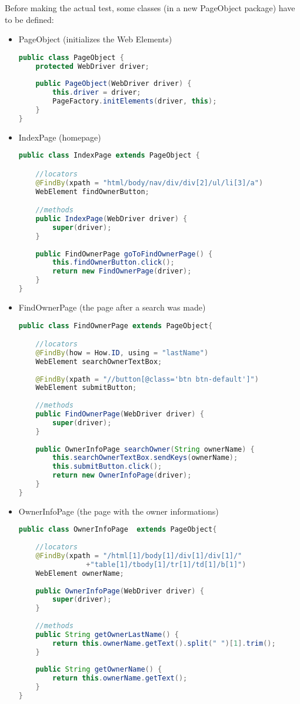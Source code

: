 \documentclass[a4paper, 10pt, titlepage]{article}
\begin{document}
Before making the actual test, some classes (in a new PageObject package) have to be defined:
\begin{itemize}
\item PageObject (initializes the Web Elements)
\begin{lstlisting}[language=java]
public class PageObject {
	protected WebDriver driver;
	
	public PageObject(WebDriver driver) {
		this.driver = driver;
		PageFactory.initElements(driver, this);
	}
}
\end{lstlisting}
\item IndexPage (homepage)
\begin{lstlisting}[language=java]
public class IndexPage extends PageObject {

	//locators
	@FindBy(xpath = "html/body/nav/div/div[2]/ul/li[3]/a")
	WebElement findOwnerButton;

	//methods
	public IndexPage(WebDriver driver) {
		super(driver);
	}
	
	public FindOwnerPage goToFindOwnerPage() {
		this.findOwnerButton.click();
		return new FindOwnerPage(driver);
	}
}
\end{lstlisting}
\item FindOwnerPage (the page after a search was made)
\begin{lstlisting}[language=java]
public class FindOwnerPage extends PageObject{

	//locators
	@FindBy(how = How.ID, using = "lastName")
	WebElement searchOwnerTextBox;
	
	@FindBy(xpath = "//button[@class='btn btn-default']")
	WebElement submitButton;
	
	//methods
	public FindOwnerPage(WebDriver driver) {
		super(driver);
	}
	
	public OwnerInfoPage searchOwner(String ownerName) {
		this.searchOwnerTextBox.sendKeys(ownerName);
		this.submitButton.click();
		return new OwnerInfoPage(driver);
	}
}
\end{lstlisting}

\item OwnerInfoPage (the page with the owner informations)
\begin{lstlisting}[language=java]
public class OwnerInfoPage  extends PageObject{
	
	//locators
	@FindBy(xpath = "/html[1]/body[1]/div[1]/div[1]/" 
				+"table[1]/tbody[1]/tr[1]/td[1]/b[1]")
	WebElement ownerName;
	
	public OwnerInfoPage(WebDriver driver) {
		super(driver);
	}
	
	//methods
	public String getOwnerLastName() {
		return this.ownerName.getText().split(" ")[1].trim();
	}
	
	public String getOwnerName() {
		return this.ownerName.getText();
	}
}
\end{lstlisting}

\end{itemize}
\end{document}
